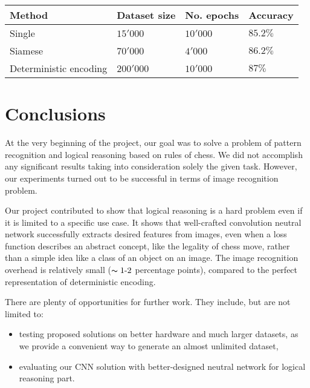 \documentclass[10pt,twocolumn,letterpaper]{article}
\begin{document}
\begin{center}
    \begin{tabular}{ | p{5em} | p{5em} | p{5em} | p{5em} |}
    \hline
    Method & Dataset size & No. epochs & Accuracy \\ [0.5ex] \hline \hline
    Single & $15'000$ & $10'000$ & $85.2\%$ \\
    \hline
    Siamese & $70'000$ & $4'000$ & $86.2\%$ \\ \hline
    Deterministic encoding & $200'000$ & $10'000$ & $87\%$ \\
    \hline
    \end{tabular}
\end{center}

\section{Conclusions}

At the very beginning of the project, our goal was to solve a problem of pattern
recognition and logical reasoning based on rules of chess. We did not accomplish
any significant results taking into consideration solely the given task.
However, our experiments turned out to be successful in terms of image
recognition problem.

Our project contributed to show that logical reasoning is a hard problem even if
it is limited to a specific use case. It shows that well-crafted convolution
neutral network successfully extracts desired features from images, even when a
loss function describes an abstract concept, like the legality of chess move,
rather than a simple idea like a class of an object on an image. The image
recognition overhead is relatively small ($\thicksim 1 \text{-} 2$ percentage
points), compared to the perfect representation of deterministic encoding.

There are plenty of opportunities for further work. They include, but are not
limited to:
\begin{itemize}
\item testing proposed solutions on better hardware and much larger datasets, as
we provide a convenient way to generate an almost unlimited dataset,
\item evaluating our CNN solution with better-designed neutral network for
logical reasoning part.
\end{itemize}

{\small


}
\end{document}
